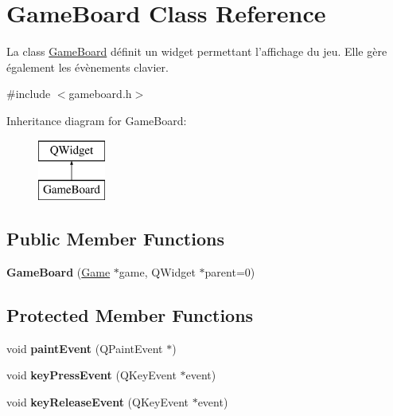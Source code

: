 \hypertarget{classGameBoard}{\section{Game\-Board Class Reference}
\label{classGameBoard}
}


La class \hyperlink{classGameBoard}{Game\-Board} définit un widget permettant l'affichage du jeu. Elle gère également les évènements clavier.  




{\ttfamily \#include $<$gameboard.\-h$>$}

Inheritance diagram for Game\-Board\-:\begin{figure}[H]
\begin{center}
\leavevmode
\includegraphics[height=2.000000cm]{classGameBoard}
\end{center}
\end{figure}
\subsection*{Public Member Functions}
\begin{DoxyCompactItemize}
\item 
\hypertarget{classGameBoard_a1a815e159958fed5ba4a5e23fa934835}{{\bfseries Game\-Board} (\hyperlink{classGame}{Game} $\ast$game, Q\-Widget $\ast$parent=0)}\label{classGameBoard_a1a815e159958fed5ba4a5e23fa934835}

\end{DoxyCompactItemize}
\subsection*{Protected Member Functions}
\begin{DoxyCompactItemize}
\item 
\hypertarget{classGameBoard_ae70803877f040a743eb8e424902974f3}{void {\bfseries paint\-Event} (Q\-Paint\-Event $\ast$)}\label{classGameBoard_ae70803877f040a743eb8e424902974f3}

\item 
\hypertarget{classGameBoard_a3fdf1e6bfcc24a0930196be5fc3150c1}{void {\bfseries key\-Press\-Event} (Q\-Key\-Event $\ast$event)}\label{classGameBoard_a3fdf1e6bfcc24a0930196be5fc3150c1}

\item 
\hypertarget{classGameBoard_a65228d1bdb0e856cb3115fb171185636}{void {\bfseries key\-Release\-Event} (Q\-Key\-Event $\ast$event)}\label{classGameBoard_a65228d1bdb0e856cb3115fb171185636}

\end{DoxyCompactItemize}


